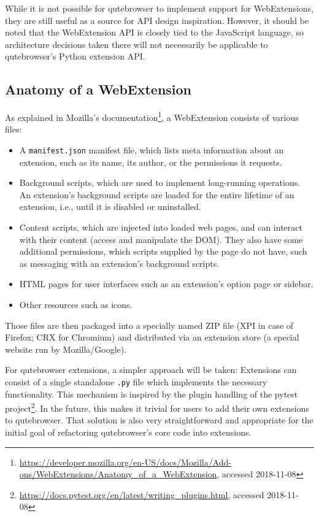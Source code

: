 \documentclass[a4paper,parskip=full,DIV=14,BCOR=15mm]{scrreprt}
\begin{document}
While it is not possible for qutebrowser to implement support for WebExtensions,
they are still useful as a source for API design inspiration. However, it
should be noted that the WebExtension API is closely tied to the JavaScript
language, so architecture decisions taken there will not necessarily be
applicable to qutebrowser's Python extension API.

\subsection{Anatomy of a WebExtension}
\label{anatomy}

As explained in Mozilla's
documentation\footnote{\url{https://developer.mozilla.org/en-US/docs/Mozilla/Add-ons/WebExtensions/Anatomy_of_a_WebExtension},
  accessed 2018-11-08},
a WebExtension consists of various files:

\begin{itemize}
  \item A \verb|manifest.json| manifest file, which lists meta information about
    an extension, such as its name, its author, or the permissions it requests.
  \item Background scripts, which are used to implement long-running operations.
    An extension's background scripts are loaded for the entire lifetime of an
    extension, i.e., until it is disabled or uninstalled.
  \item Content scripts, which are injected into loaded web pages, and can
    interact with their content (access and manipulate the DOM). They also have
    some additional permissions, which scripts supplied by the page do not have,
    such as messaging with an extension's background scripts.
  \item HTML pages for user interfaces such as an extension's option page or sidebar.
  \item Other resources such as icons.
\end{itemize}

Those files are then packaged into a specially named ZIP file (XPI in case of
Firefox; CRX for Chromium) and distributed via an extension store (a special
website run by Mozilla/Google).

For qutebrowser extensions, a simpler approach will be taken: Extensions can
consist of a single standalone \verb|.py| file which implements the necessary
functionality. This mechanism is inspired by the plugin handling of the pytest
project\footnote{\url{https://docs.pytest.org/en/latest/writing_plugins.html},
  accessed 2018-11-08}. In the future, this makes it trivial for users to add
their own extensions to qutebrowser. That solution is also very straightforward and
appropriate for the initial goal of refactoring qutebrowser's core code into
extensions.
\end{document}
